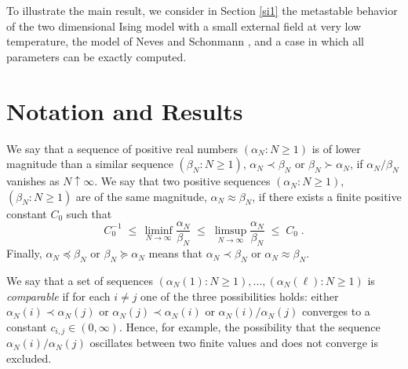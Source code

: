 \documentclass[reqno]{amsart}
\begin{document}
To illustrate the main result, we consider in Section \ref{si1} the
metastable behavior of the two dimensional Ising model with a small
external field at very low temperature, the model of Neves and
Schonmann \cite{ns1, ns2}, and a case in which all parameters can be
exactly computed.

\section{Notation and Results}
\label{sec3}

We say that a sequence of positive real numbers $(\alpha_N : N\ge 1)$
is of lower magnitude than a similar sequence $(\beta_N : N\ge 1)$,
$\alpha_N \prec \beta_N$ or $\beta_N \succ \alpha_N$, if
$\alpha_N/\beta_N$ vanishes as $N\uparrow\infty$. We say that two
positive sequences $(\alpha_N : N\ge 1)$, $(\beta_N : N\ge 1)$ are of
the same magnitude, $\alpha_N \approx \beta_N$, if there exists a
finite positive constant $C_0$ such that
\begin{equation*}
C_0^{-1} \;\le\, \liminf_{N\to\infty} \frac{\alpha_N}{\beta_N} \;\le\;
\limsup_{N\to\infty} \frac{\alpha_N}{\beta_N} \;\le\; C_0\;. 
\end{equation*}
Finally, $\alpha_N\preceq \beta_N$ or $\beta_N \succeq \alpha_N$ means
that $\alpha_N \prec \beta_N$ or $\alpha_N \approx \beta_N$.

We say that a set of sequences $(\alpha_N (1): N\ge 1), \dots,
(\alpha_N (\ell): N\ge 1)$ is \emph{comparable} if for each $i\not =
j$ one of the three possibilities holds: either $\alpha_N (i) \prec
\alpha_N (j)$ or $\alpha_N (j) \prec \alpha_N (i)$ or $\alpha_N
(i)/\alpha_N (j)$ converges to a constant $c_{i,j}\in (0,\infty)$.
Hence, for example, the possibility that the sequence $\alpha_N
(i)/\alpha_N (j)$ oscillates between two finite values and does not
converge is excluded.
\smallskip
\end{document}
